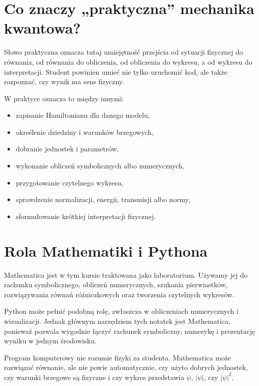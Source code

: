 \section{Co znaczy „praktyczna” mechanika kwantowa?}

Słowo praktyczna oznacza tutaj umiejętność przejścia od sytuacji fizycznej do
równania, od równania do obliczenia, od obliczenia do wykresu, a od wykresu do
interpretacji. Student powinien umieć nie tylko uruchomić kod, ale także
rozpoznać, czy wynik ma sens fizyczny.

W praktyce oznacza to między innymi:
\begin{itemize}
    \item zapisanie Hamiltonianu dla danego modelu,
    \item określenie dziedziny i warunków brzegowych,
    \item dobranie jednostek i parametrów,
    \item wykonanie obliczeń symbolicznych albo numerycznych,
    \item przygotowanie czytelnego wykresu,
    \item sprawdzenie normalizacji, energii, transmisji albo normy,
    \item sformułowanie krótkiej interpretacji fizycznej.
\end{itemize}

\section{Rola Mathematiki i Pythona}

Mathematica jest w tym kursie traktowana jako laboratorium. Używamy jej do
rachunku symbolicznego, obliczeń numerycznych, szukania pierwiastków,
rozwiązywania równań różniczkowych oraz tworzenia czytelnych wykresów.

Python może pełnić podobną rolę, zwłaszcza w obliczeniach numerycznych i
wizualizacji. Jednak głównym narzędziem tych notatek jest Mathematica, ponieważ
pozwala wygodnie łączyć rachunek symboliczny, numerykę i prezentację wyniku w
jednym środowisku.

\begin{warningbox}
Program komputerowy nie rozumie fizyki za studenta. Mathematica może rozwiązać
równanie, ale nie powie automatycznie, czy użyto dobrych jednostek, czy warunki
brzegowe są fizyczne i czy wykres przedstawia \(\psi\), \(|\psi|\), czy
\(|\psi|^2\).
\end{warningbox}


